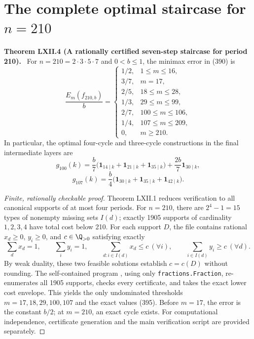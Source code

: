 \documentclass[11pt,a4paper,oneside]{book}
\newcommand{\one}{\mathbf 1}\newcommand{\ii}{\mathrm i}\newcommand{\dd}{\mathrm d}
\newcommand{\statement}[3]{\par\medskip\noindent\textbf{#1 #2 (#3).}\ }
\begin{document}
\section{The complete optimal staircase for $n=210$}
\statement{Theorem}{LXII.4}{A rationally certified seven-step staircase for period 210}
For $n=210=2\cdot3\cdot5\cdot7$ and $0<b\le1$, the minimax error in (390) is
\begin{equation}
\frac{E_m(f_{210,b})}{b}=\begin{cases}
1/2,&1\le m\le16,\\
3/7,&m=17,\\
2/5,&18\le m\le28,\\
1/3,&29\le m\le99,\\
2/7,&100\le m\le106,\\
1/4,&107\le m\le209,\\
0,&m\ge210.
\end{cases}\tag{395}
\end{equation}
In particular, the optimal four-cycle and three-cycle constructions in the final intermediate layers are
\begin{equation}
g_{100}(k)=\frac b7\bigl(\one_{14\mid k}+\one_{21\mid k}+\one_{35\mid k}\bigr)+\frac{2b}{7}\one_{30\mid k},\tag{396}
\end{equation}
\begin{equation}
g_{107}(k)=\frac b4\bigl(\one_{30\mid k}+\one_{35\mid k}+\one_{42\mid k}\bigr).\tag{397}
\end{equation}
\begin{proof}[Finite, rationally checkable proof]
Theorem LXII.1 reduces verification to all canonical supports of at most four periods. For $n=210$, there are $2^4-1=15$ types of nonempty missing sets $I(d)$; exactly 1905 supports of cardinality $1,2,3,4$ have total cost below 210. For each support $D$, the file  contains rational $x_d\ge0$, $y_i\ge0$, and $c\in\Q_{>0}$ satisfying exactly
\[
\sum_dx_d=1,\qquad \sum_iy_i=1,\qquad
\sum_{d:i\in I(d)}x_d\le c\ (\forall i),\qquad
\sum_{i\in I(d)}y_i\ge c\ (\forall d).
\]
By weak duality, these two feasible solutions establish $c=c(D)$ without rounding. The self-contained program , using only \texttt{fractions.Fraction}, re-enumerates all 1905 supports, checks every certificate, and takes the exact lower cost envelope. This yields the only undominated thresholds $m=17,18,29,100,107$ and the exact values (395). Before $m=17$, the error is the constant $b/2$; at $m=210$, an exact cycle exists. For computational independence, certificate generation and the main verification script are provided separately.
\end{proof}
\end{document}
